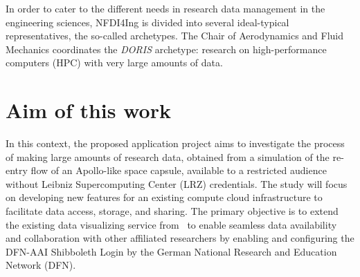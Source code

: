 In order to cater to the different needs in research data management in the
engineering sciences, NFDI4Ing is divided into several ideal-typical
representatives, the so-called archetypes. The Chair of Aerodynamics and Fluid
Mechanics coordinates the \textit{DORIS} archetype: research on high-performance
computers (HPC) with very large amounts of data. 

\section{Aim of this work}
In this context, the proposed application project aims to investigate the
process of making large amounts of research data, obtained from a simulation of
the re-entry flow of an Apollo-like space capsule, available to a restricted
audience without Leibniz Supercomputing Center (LRZ) credentials. The study will
focus on developing new features for an existing compute cloud infrastructure to
facilitate data access, storage, and sharing. The primary objective is to extend
the existing data visualizing service from~\cite{nowak2024pvw} to enable
seamless data availability and collaboration with other affiliated researchers
by enabling and configuring the DFN-AAI Shibboleth Login by the German National
Research and Education Network (DFN). 

